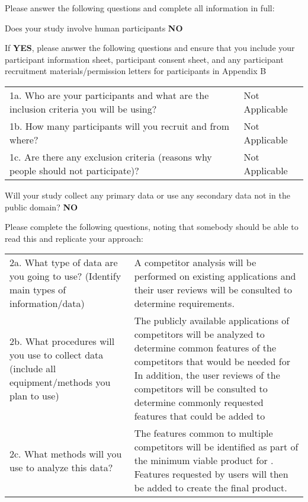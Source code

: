 \documentclass[../CHEFCookingHelper.tex]{subfiles}
\begin{document}
Please answer the following questions and complete all information in full:

Does your study involve human participants \textbf{NO}


If \textbf{YES}, please answer the following questions and ensure that you include your participant
information sheet, participant consent sheet, and any participant recruitment materials/permission
letters for participants in Appendix B

\begin{table}[H]
    \begin{tabulary}{\textwidth}{LL}
        \toprule
        1a. Who are your participants and what are the inclusion criteria you will be using? & Not Applicable \\
        1b. How many participants will you recruit and from where? & Not Applicable \\
        1c. Are there any exclusion criteria (reasons why people should not participate)? & Not Applicable \\
        \bottomrule
    \end{tabulary}
\end{table}

Will your study collect any primary data or use any secondary data not in the public domain? \textbf{NO}

Please complete the following questions, noting that somebody should be able to read this and replicate your approach:

\begin{table}[H]
    \begin{tabulary}{\textwidth}{LL}
        \toprule
        2a. What type of data are you going to use? (Identify main types of information/data)
            &
        A competitor analysis will be performed on existing applications and their user reviews will be consulted to determine requirements.
            \\
        2b. What procedures will you use to collect data (include all equipment/methods you plan to use)
            &
        The publicly available applications of competitors will be analyzed to determine common features of the competitors that would be needed for \chef{}
        In addition, the user reviews of the competitors will be consulted to determine commonly requested features that could be added to \chef{}
            \\
        2c. What methods will you use to analyze this data?
            &
        The features common to multiple competitors will be identified as part of the minimum viable product for \chef{}.
        Features requested by users will then be added to create the final product.
            \\
        \bottomrule
    \end{tabulary}
\end{table}
\end{document}

